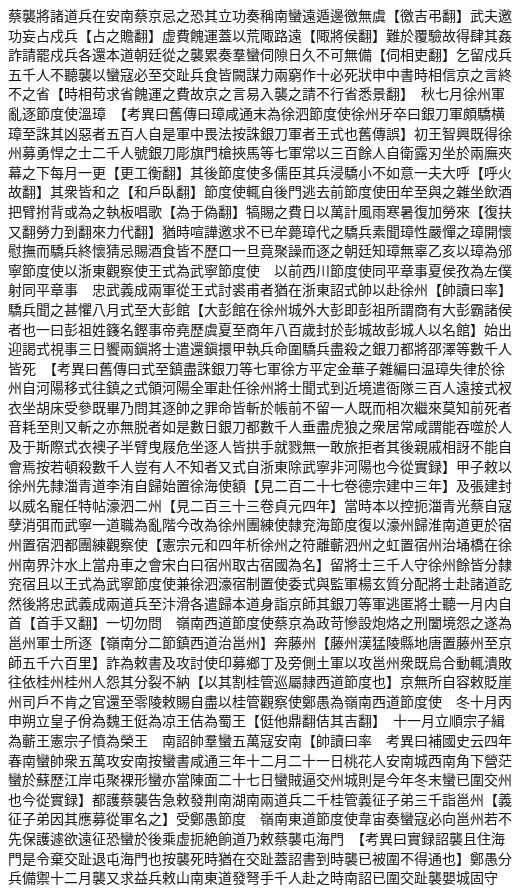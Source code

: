 蔡襲將諸道兵在安南蔡京忌之恐其立功奏稱南蠻遠遁邊徼無虞【徼吉弔翻】武夫邀功妄占戍兵【占之贍翻】虚費餽運蓋以荒陬路遠【陬將侯翻】難於覆驗故得肆其姦詐請罷戍兵各還本道朝廷從之襲累奏羣蠻伺隙日久不可無備【伺相吏翻】乞留戍兵五千人不聽襲以蠻寇必至交趾兵食皆闕謀力兩窮作十必死狀申中書時相信京之言終不之省【時相苟求省餽運之費故京之言易入襲之請不行省悉景翻】　秋七月徐州軍亂逐節度使溫璋　【考異曰舊傳曰璋咸通末為徐泗節度使徐州牙卒曰銀刀軍頗驕横璋至誅其凶惡者五百人自是軍中畏法按誅銀刀軍者王式也舊傳誤】初王智興既得徐州募勇悍之士二千人號銀刀彫旗門槍挾馬等七軍常以三百餘人自衛露刃坐於兩廡夾幕之下每月一更【更工衡翻】其後節度使多儒臣其兵浸驕小不如意一夫大呼【呼火故翻】其衆皆和之【和戶臥翻】節度使輒自後門逃去前節度使田牟至與之雜坐飲酒把臂拊背或為之執板唱歌【為于偽翻】犒賜之費日以萬計風雨寒暑復加勞來【復扶又翻勞力到翻來力代翻】猶時喧譁邀求不已牟薨璋代之驕兵素聞璋性嚴憚之璋開懷慰撫而驕兵終懷猜忌賜酒食皆不歷口一旦竟聚譟而逐之朝廷知璋無辜乙亥以璋為邠寧節度使以浙東觀察使王式為武寧節度使　以前西川節度使同平章事夏侯孜為左僕射同平章事　忠武義成兩軍從王式討裘甫者猶在浙東詔式帥以赴徐州【帥讀曰率】驕兵聞之甚懼八月式至大彭館【大彭館在徐州城外大彭即彭祖所謂商有大彭霸諸侯者也一曰彭祖姓籛名鏗事帝堯歷虞夏至商年八百歲封於彭城故彭城人以名館】始出迎謁式視事三日饗兩鎭將士遣還鎭擐甲執兵命圍驕兵盡殺之銀刀都將邵澤等數千人皆死　【考異曰舊傳曰式至鎮盡誅銀刀等七軍徐方平定金華子雜編曰温璋失律於徐州自河陽移式往鎮之式領河陽全軍赴任徐州將士聞式到近境遣衙隊三百人遠接式衩衣坐胡床受參既畢乃問其逐帥之罪命皆斬於帳前不留一人既而相次繼來莫知前死者音耗至則又斬之亦無脱者如是數日銀刀都數千人垂盡虎狼之衆居常咸謂能吞噬於人及于斯際式衣襖子半臂曳屐危坐逐人皆拱手就戮無一敢旅拒者其後親戚相訝不能自會焉按若頓殺數千人豈有人不知者又式自浙東除武寧非河陽也今從實録】甲子敕以徐州先隸湽青道李洧自歸始置徐海使額【見二百二十七卷德宗建中三年】及張建封以威名寵任特帖濠泗二州【見二百三十三卷貞元四年】當時本以控扼湽青光蔡自寇孽消弭而武寧一道職為亂階今改為徐州團練使隸兖海節度復以濠州歸淮南道更於宿州置宿泗都團練觀察使【憲宗元和四年析徐州之符離蘄泗州之虹置宿州治埇橋在徐州南界汴水上當舟車之會宋白曰宿州取古宿國為名】留將士三千人守徐州餘皆分隸兖宿且以王式為武寧節度使兼徐泗濠宿制置使委式與監軍楊玄質分配將士赴諸道訖然後將忠武義成兩道兵至汴滑各遣歸本道身詣京師其銀刀等軍逃匿將士聽一月内自首【首手又翻】一切勿問　嶺南西道節度使蔡京為政苛慘設炮烙之刑闔境怨之遂為邕州軍士所逐【嶺南分二節鎮西道治邕州】奔藤州【藤州漢猛陵縣地唐置藤州至京師五千六百里】詐為敕書及攻討使印募鄉丁及旁側土軍以攻邕州衆既烏合動輒潰敗往依桂州桂州人怨其分裂不納【以其割桂管巡屬隸西道節度也】京無所自容敕貶崖州司戶不肯之官還至零陵敕賜自盡以桂管觀察使鄭愚為嶺南西道節度使　冬十月丙申朔立皇子佾為魏王侹為凉王佶為蜀王【侹他鼎翻佶其吉翻】　十一月立順宗子緝為蘄王憲宗子憤為榮王　南詔帥羣蠻五萬寇安南【帥讀曰率　考異曰補國史云四年春南蠻帥衆五萬攻安南按蠻書咸通三年十二月二十一日桃花人安南城西南角下營茫蠻於蘇歷江岸屯聚裸形蠻亦當陳面二十七日蠻賊逼交州城則是今年冬末蠻已圍交州也今從實録】都護蔡襲告急敕發荆南湖南兩道兵二千桂管義征子弟三千詣邕州【義征子弟因其應募從軍名之】受鄭愚節度　嶺南東道節度使韋宙奏蠻寇必向邕州若不先保護遽欲遠征恐蠻於後乘虚扼絶餉道乃敕蔡襲屯海門　【考異曰實録詔襲且住海門是令棄交趾退屯海門也按襲死時猶在交趾蓋詔書到時襲已被圍不得通也】鄭愚分兵備禦十二月襲又求益兵敕山南東道發弩手千人赴之時南詔已圍交趾襲嬰城固守